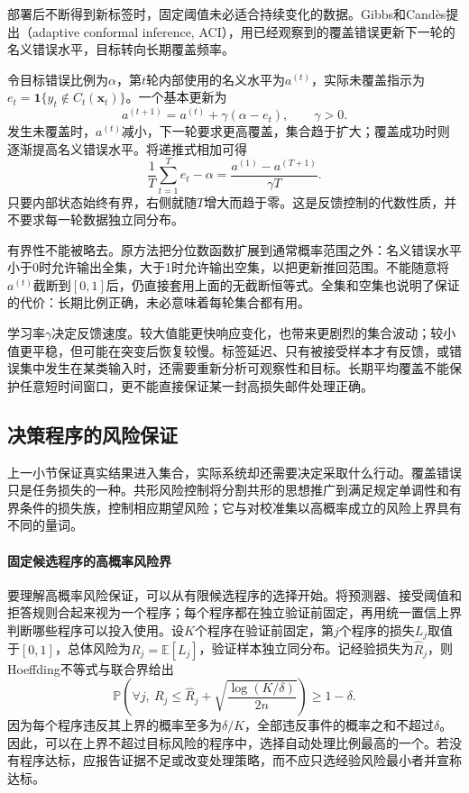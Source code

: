 部署后不断得到新标签时，固定阈值未必适合持续变化的数据。Gibbs和Candès提出（adaptive conformal inference, ACI），用已经观察到的覆盖错误更新下一轮的名义错误水平，目标转向长期覆盖频率。

令目标错误比例为$\alpha$，第$t$轮内部使用的名义水平为$a^{(t)}$，实际未覆盖指示为$e_t=\mathbf1\{y_t\notin C_t(\bm{x}_t)\}$。一个基本更新为
\begin{equation}
 a^{(t+1)}=a^{(t)}+\gamma(\alpha-e_t),
 \qquad \gamma>0.
 \label{eq:reliability-aci}
\end{equation}
发生未覆盖时，$a^{(t)}$减小，下一轮要求更高覆盖，集合趋于扩大；覆盖成功时则逐渐提高名义错误水平。将递推式相加可得
\[
 \frac1T\sum_{t=1}^{T}e_t-\alpha
 =\frac{a^{(1)}-a^{(T+1)}}{\gamma T}.
\]
只要内部状态始终有界，右侧就随$T$增大而趋于零。这是反馈控制的代数性质，并不要求每一轮数据独立同分布。

有界性不能被略去。原方法把分位数函数扩展到通常概率范围之外：名义错误水平小于0时允许输出全集，大于1时允许输出空集，以把更新推回范围。不能随意将$a^{(t)}$截断到$[0,1]$后，仍直接套用上面的无截断恒等式。全集和空集也说明了保证的代价：长期比例正确，未必意味着每轮集合都有用。

学习率$\gamma$决定反馈速度。较大值能更快响应变化，也带来更剧烈的集合波动；较小值更平稳，但可能在突变后恢复较慢。标签延迟、只有被接受样本才有反馈，或错误集中发生在某类输入时，还需要重新分析可观察性和目标。长期平均覆盖不能保护任意短时间窗口，更不能直接保证某一封高损失邮件处理正确。

\subsection{决策程序的风险保证}

上一小节保证真实结果进入集合，实际系统却还需要决定采取什么行动。覆盖错误只是任务损失的一种。共形风险控制将分割共形的思想推广到满足规定单调性和有界条件的损失族，控制相应期望风险；它与对校准集以高概率成立的风险上界具有不同的量词。

\paragraph{固定候选程序的高概率风险界}

要理解高概率风险保证，可以从有限候选程序的选择开始。将预测器、接受阈值和拒答规则合起来视为一个程序；每个程序都在独立验证前固定，再用统一置信上界判断哪些程序可以投入使用。设$K$个程序在验证前固定，第$j$个程序的损失$L_j$取值于$[0,1]$，总体风险为$R_j=\mathbb E[L_j]$，验证样本独立同分布。记经验损失为$\hat R_j$，则Hoeffding不等式与联合界给出
\begin{equation}
 \mathbb P\left(
  \forall j,\ R_j\leq
  \hat R_j+\sqrt{\frac{\log(K/\delta)}{2n}}
 \right)\geq1-\delta.
 \label{eq:reliability-finite-program-bound}
\end{equation}
因为每个程序违反其上界的概率至多为$\delta/K$，全部违反事件的概率之和不超过$\delta$。因此，可以在上界不超过目标风险的程序中，选择自动处理比例最高的一个。若没有程序达标，应报告证据不足或改变处理策略，而不应只选经验风险最小者并宣称达标。

